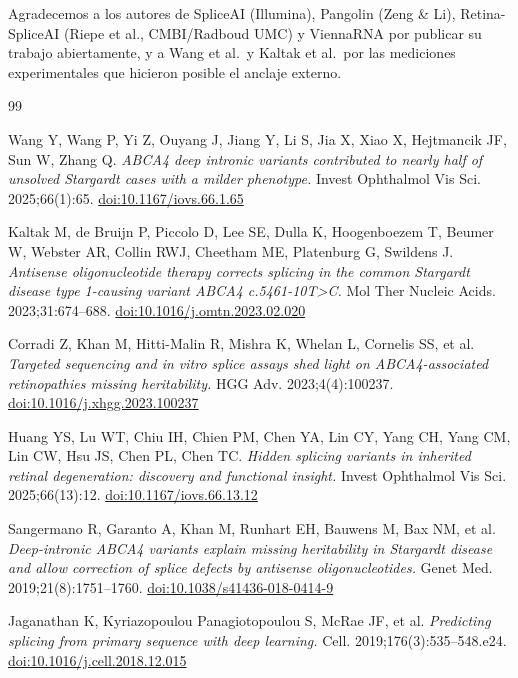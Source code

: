 \documentclass[11pt,a4paper]{article}
\begin{document}
Agradecemos a los autores de SpliceAI (Illumina), Pangolin (Zeng \& Li), Retina-SpliceAI
(Riepe et al., CMBI/Radboud UMC) y ViennaRNA por publicar su trabajo abiertamente, y a Wang
et al.\ y Kaltak et al.\ por las mediciones experimentales que hicieron posible el anclaje externo.

\clearpage
{}
\begin{thebibliography}{99}
\small

Wang Y, Wang P, Yi Z, Ouyang J, Jiang Y, Li S, Jia X, Xiao X, Hejtmancik JF, Sun W, Zhang Q.
\emph{ABCA4 deep intronic variants contributed to nearly half of unsolved Stargardt cases with a
milder phenotype.} Invest Ophthalmol Vis Sci. 2025;66(1):65.
\href{https://doi.org/10.1167/iovs.66.1.65}{doi:10.1167/iovs.66.1.65}

Kaltak M, de Bruijn P, Piccolo D, Lee SE, Dulla K, Hoogenboezem T, Beumer W, Webster AR,
Collin RWJ, Cheetham ME, Platenburg G, Swildens J.
\emph{Antisense oligonucleotide therapy corrects splicing in the common Stargardt disease type
1-causing variant ABCA4 c.5461-10T>C.} Mol Ther Nucleic Acids. 2023;31:674--688.
\href{https://doi.org/10.1016/j.omtn.2023.02.020}{doi:10.1016/j.omtn.2023.02.020}

Corradi Z, Khan M, Hitti-Malin R, Mishra K, Whelan L, Cornelis SS, et al.
\emph{Targeted sequencing and in vitro splice assays shed light on ABCA4-associated retinopathies
missing heritability.} HGG Adv. 2023;4(4):100237.
\href{https://doi.org/10.1016/j.xhgg.2023.100237}{doi:10.1016/j.xhgg.2023.100237}

Huang YS, Lu WT, Chiu IH, Chien PM, Chen YA, Lin CY, Yang CH, Yang CM, Lin CW, Hsu JS, Chen PL,
Chen TC. \emph{Hidden splicing variants in inherited retinal degeneration: discovery and functional
insight.} Invest Ophthalmol Vis Sci. 2025;66(13):12.
\href{https://doi.org/10.1167/iovs.66.13.12}{doi:10.1167/iovs.66.13.12}

Sangermano R, Garanto A, Khan M, Runhart EH, Bauwens M, Bax NM, et al.
\emph{Deep-intronic ABCA4 variants explain missing heritability in Stargardt disease and allow
correction of splice defects by antisense oligonucleotides.} Genet Med. 2019;21(8):1751--1760.
\href{https://doi.org/10.1038/s41436-018-0414-9}{doi:10.1038/s41436-018-0414-9}

Jaganathan K, Kyriazopoulou Panagiotopoulou S, McRae JF, et al.
\emph{Predicting splicing from primary sequence with deep learning.}
Cell. 2019;176(3):535--548.e24.
\href{https://doi.org/10.1016/j.cell.2018.12.015}{doi:10.1016/j.cell.2018.12.015}


\end{thebibliography}
\end{document}
